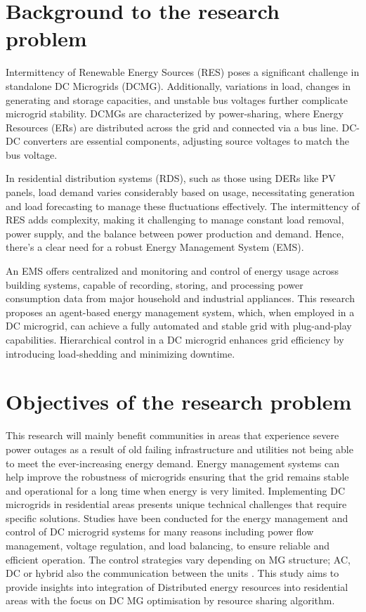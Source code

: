 \section{Background to the research problem}
Intermittency of Renewable Energy Sources (RES) poses a significant challenge in standalone DC Microgrids (DCMG). Additionally, variations in load, changes in generating and storage capacities, and unstable bus voltages further complicate microgrid stability. DCMGs are characterized by power-sharing, where Energy Resources (ERs) are distributed across the grid and connected via a bus line. DC-DC converters are essential components, adjusting source voltages to match the bus voltage.\par

In residential distribution systems (RDS), such as those using DERs like PV panels, load demand varies considerably based on usage, necessitating generation and load forecasting to manage these fluctuations effectively. The intermittency of RES adds complexity, making it challenging to manage constant load removal, power supply, and the balance between power production and demand. Hence, there's a clear need for a robust Energy Management System (EMS).\par

An EMS offers centralized and monitoring and control of energy usage across building systems, capable of recording, storing, and processing power consumption data from major household and industrial appliances. This research proposes an agent-based energy management system, which, when employed in a DC microgrid, can achieve a fully automated and stable grid with plug-and-play capabilities. Hierarchical control in a DC microgrid enhances grid efficiency by introducing load-shedding and minimizing downtime.\par

\section{Objectives of the research problem}
This research will mainly benefit communities in areas that experience severe power outages as a result of old failing infrastructure and utilities not being able to meet the ever-increasing energy demand. Energy management systems can help improve the robustness of microgrids ensuring that the grid remains stable and operational for a long time when energy is very limited.  Implementing DC microgrids in residential areas presents unique technical challenges that require specific solutions. Studies have been conducted for the energy management and control of DC microgrid systems for many reasons including power flow management, voltage regulation, and load balancing, to ensure reliable and efficient operation. The control strategies vary depending on MG structure; AC, DC \cite{2}  or hybrid also the communication between the units \cite{3}.  This study aims to provide insights into integration of Distributed energy resources into residential areas with the focus on DC MG optimisation by resource sharing algorithm. 

